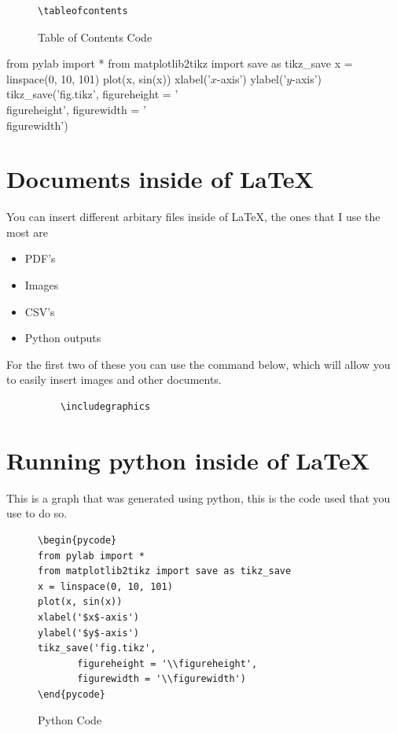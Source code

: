 \documentclass[12pt, letterpaper, oneside]{article} \usepackage[utf8]{inputenc}
\newlength\figureheight
\newlength\figurewidth
\begin{document}
\begin{figure}[H]
\begin{lstlisting}
\tableofcontents
\end{lstlisting}
	\caption{Table of Contents Code}
\end{figure}



\begin{pycode}
from pylab import *
from matplotlib2tikz import save as tikz_save
x = linspace(0, 10, 101)
plot(x, sin(x))
xlabel('$x$-axis')
ylabel('$y$-axis')
tikz_save('fig.tikz',
       figureheight = '\\figureheight',
       figurewidth = '\\figurewidth')
\end{pycode}

\pagebreak

\section{Documents inside of \LaTeX{}}

You can insert different arbitary files inside of \LaTeX{}, the ones that I use the most are 

\begin{itemize}
	\item PDF's
	\item Images
	\item CSV's
	\item Python outputs
\end{itemize}

For the first two of these you can use the command below, which will allow you to easily insert images and other documents.
\begin{figure}[H]
	\begin{lstlisting}
	\includegraphics
	\end{lstlisting}
\end{figure}


\section{Running python inside of \LaTeX{}}

This is a graph that was generated using python, this is the code used that you use to do so.

\begin{center}
\begin{figure}[H]
	\centering
	\begin{lstlisting}
\begin{pycode}
from pylab import *
from matplotlib2tikz import save as tikz_save
x = linspace(0, 10, 101)
plot(x, sin(x))
xlabel('$x$-axis')
ylabel('$y$-axis')
tikz_save('fig.tikz',
       figureheight = '\\figureheight',
       figurewidth = '\\figurewidth')
\end{pycode}
	\end{lstlisting}
	\caption{Python Code}
\end{figure}
\end{center}
\end{document}
